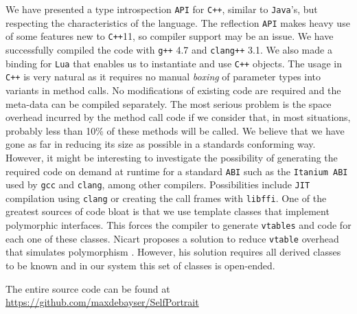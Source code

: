 We have presented a type introspection \texttt{API} for \texttt{C++}, similar to \texttt{Java}'s, but respecting the characteristics of the language.
The reflection \texttt{API} makes heavy use of some features new to \texttt{C++}11, so compiler support may be an issue. We have successfully
compiled the code with \texttt{g++} 4.7 and \texttt{clang++} 3.1.
We also made a binding for \texttt{Lua} that enables us to instantiate and use \texttt{C++} objects.
The usage in \texttt{C++} is very natural as it requires no manual \emph{boxing} of parameter types into variants in method calls.
No modifications of existing code are required and the meta-data can be compiled separately.
The most serious problem is the space overhead incurred by the method call code if we consider that, in most situations,
probably less than 10\% of these methods will be called. We believe that we have gone as far in reducing its size as possible
in a standards conforming way. However, it might be interesting to investigate the possibility of generating the required
code on demand at runtime for a standard \texttt{ABI} such as the \texttt{Itanium ABI} used by \texttt{gcc} and \texttt{clang}, among other compilers.
Possibilities include \texttt{JIT} compilation using \texttt{clang} or creating the call frames with \texttt{libffi}.
One of the greatest sources of code bloat is that we use template classes that implement polymorphic interfaces.
This forces the compiler to generate \texttt{vtables} and code for each one of these classes. Nicart proposes a solution to reduce
\texttt{vtable} overhead that simulates polymorphism \cite{Nicart}. However, his solution requires all derived classes to be
known and in our system this set of classes is open-ended.

The entire source code can be found at \url{https://github.com/maxdebayser/SelfPortrait}